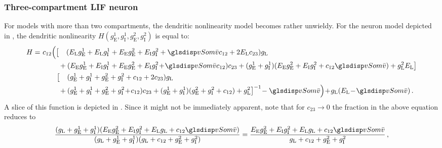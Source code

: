 \subsubsection{Three-compartment LIF neuron}
For models with more than two compartments, the dendritic nonlinearity model becomes rather unwieldy.
For the neuron model depicted in , the dendritic nonlinearity $H(g_\mathrm{E}^1, g_\mathrm{I}^1, g_\mathrm{E}^2, g_\mathrm{I}^2)$ is equal to:
\begin{align}
	\begin{aligned}
	 H = &~
		c_{12} \Bigl(
				\bigl[
					\hphantom{+} \; (
					  E_\mathrm{L} g_\mathrm{E}^1
					+ E_\mathrm{L} g_\mathrm{I}^1
					+ E_\mathrm{E} g_\mathrm{E}^2
					+ E_\mathrm{I} g_\mathrm{I}^2
					+ \vSom  c_\mathrm{12}
					+ 2 E_\mathrm{L} c_{23} 
					) g_\mathrm{L}\\
	&~\hspace{0.7cm} \;
					  + (
					    E_\mathrm{E} g_\mathrm{E}^1
					  + E_\mathrm{I} g_\mathrm{I}^1
					  + E_\mathrm{E} g_\mathrm{E}^2
					  + E_\mathrm{I} g_\mathrm{I}^2
					  \! + \! \vSom c_\mathrm{12}) c_{23}
                      + (g_\mathrm{E}^1 + g_\mathrm{I}^1)
					  (E_\mathrm{E} g_\mathrm{E}^2 + E_\mathrm{I} g_\mathrm{I}^2 + c_{12} \vSom) + g_\mathrm{L}^2 E_\mathrm{L}
				\bigr] \\
	&~\hspace{0.7cm}
				\bigl[
					\hphantom{+} \; (
					g_\mathrm{E}^1 +
					g_\mathrm{I}^1 +
					g_\mathrm{E}^2 +
					g_\mathrm{I}^2 +
					c_{12} +
					2 c_{23}) g_\mathrm{L} \\
	&~\hspace{0.7cm} \;
				  + (g_\mathrm{E}^1 + g_\mathrm{I}^1 + g_\mathrm{E}^2 + g_\mathrm{I}^2 \! + \! c_\mathrm{12}) c_{23}
				+ (g_\mathrm{E}^1 + g_\mathrm{I}^1) (g_\mathrm{E}^2 + g_\mathrm{I}^2 + c_{12}) + g_\mathrm{L}^2
			\bigr]^{-1}
			\! - \vSom
		\Bigr) \! + \! g_\mathrm{L}(E_\mathrm{L} \! - \! \vSom) \,.
	\end{aligned}
	\label{eqn:three_comp_lif_long}
\end{align}
A slice of this function is depicted in .
Since it might not be immediately apparent, note that for $c_{23} \to 0$ the fraction in the above equation reduces to
\begin{align*}
		\frac{
			(g_\mathrm{L} + g_\mathrm{E}^1 + g_\mathrm{I}^1) (E_\mathrm{E} g_\mathrm{E}^2 + E_\mathrm{I} g_\mathrm{I}^2 + E_\mathrm{L} g_\mathrm{L} + c_\mathrm{12} \vSom)
		}{
			(g_\mathrm{L} + g_\mathrm{E}^1 + g_\mathrm{I}^1)
			(g_\mathrm{L} + c_{12} + g_\mathrm{E}^2 + g_\mathrm{I}^2)
		}
	 =
	 		\frac{
				E_\mathrm{E} g_\mathrm{E}^2 + E_\mathrm{I} g_\mathrm{I}^2 + E_\mathrm{L} g_\mathrm{L} + c_\mathrm{12} \vSom
	 		}{
				g_\mathrm{L} + c_{12} + g_\mathrm{E}^2 + g_\mathrm{I}^2
	 		} \,,
\end{align*}
